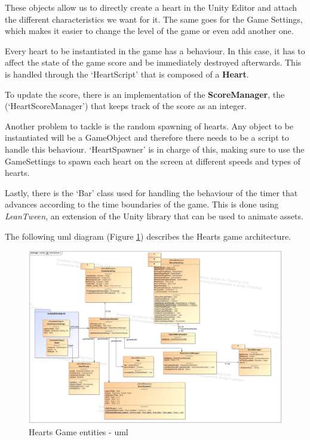These objects allow us to directly create a heart in the Unity Editor and attach the different characteristics we want for it. The same goes for the Game Settings, which makes it easier to change the level of the game or even add another one.

Every heart to be instantiated in the game has a behaviour. In this case, it has to affect the state of the game score and be immediately destroyed afterwards. This is handled through the `HeartScript' that is composed of a \textbf{Heart}.

To update the score, there is an implementation of the \textbf{ScoreManager}, the (`HeartScoreManager') that keeps track of the score as an integer.

Another problem to tackle is the random spawning of hearts. Any object to be instantiated will be a GameObject and therefore there needs to be a script to handle this behaviour. `HeartSpawner' is in charge of this, making sure to use the GameSettings to spawn each heart on the screen at different speeds and types of hearts.

Lastly, there is the `Bar' class used for handling the behaviour of the timer that advances according to the time boundaries of the game. This is done using \textit{LeanTween}, an extension of the Unity library that can be used to animate assets.

The following \gls{uml} diagram (Figure \ref{fig:heartsGameArq}) describes the Hearts game architecture.

\begin{figure}[H]
    \centering
    \includegraphics[width=\linewidth]{Chapters/new_architechture/class__hearts__HeartsGame.jpg}
    \caption{Hearts Game entities - \gls{uml}}
    \label{fig:heartsGameArq}
\end{figure}


